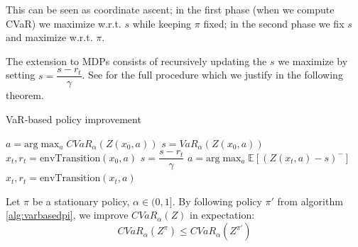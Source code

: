 This can be seen as coordinate ascent; in the first phase (when we compute CVaR) we maximize w.r.t. $s$ while keeping $\pi$ fixed; in the second phase we fix $s$ and maximize w.r.t. $\pi$.

The extension to MDPs consists of recursively updating the $s$ we maximize by setting $s = \dfrac{s - r_t}{\gamma}$. See  for the full procedure which we justify in the following theorem.

\begin{algorithm}
\caption{VaR-based policy improvement}
\label{alg:varbasedpi}
\begin{algorithmic}
    \STATE $a = \text{arg}\max_a CVaR_\alpha(Z(x_0, a))$
    \STATE $s = VaR_\alpha(Z(x_0, a))$
    \STATE $x_t, r_t = \text{envTransition}(x_0, a)$
    	\STATE $s = \dfrac{s-r_t}{\gamma}$
    	\STATE $a = \text{arg}\max_a \mathbb{E}\left[(Z(x_t, a)-s)^- \right]$
    	\STATE $x_t, r_t = \text{envTransition}(x_t, a)$
   	\ENDWHILE
\end{algorithmic}
\end{algorithm}

\begin{theorem}
Let $\pi$ be a stationary policy, $\alpha \in (0, 1]$. 
By following policy $\pi'$ from algorithm \ref{alg:varbasedpi}, we improve $CVaR_\alpha(Z)$ in expectation:
$$CVaR_\alpha(Z^\pi) \le CVaR_\alpha(Z^{\pi'})$$
%
%

\end{theorem}

